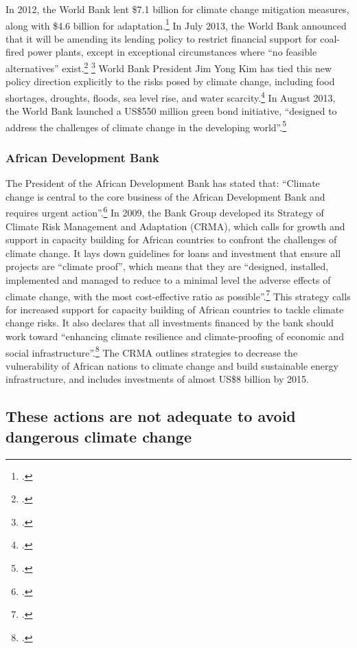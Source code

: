 \documentclass[10pt]{article}
\begin{document}
In 2012, the World Bank lent \$7.1 billion for climate change mitigation measures, along with \$4.6 billion for adaptation.\footcite[][]{WorldBankCCPP}
In July 2013, the World Bank announced that it will be amending its lending policy to restrict financial support for coal-fired power plants, except in exceptional circumstances where ``no feasible alternatives'' exist.\footcite[][]{WorldBankCoal2013} \footcite[See also: ][]{ReutersonWBCoal}
World Bank President Jim Yong Kim has tied this new policy direction explicitly to the risks posed by climate change, including food shortages, droughts, floods, sea level rise, and water scarcity.\footcite[][]{WBPresonCC}
In August 2013, the World Bank launched a US\$550 million green bond initiative, ``designed to address the challenges of climate change in the developing world''.\footcite[][]{WBGreenB2013}



	\subsubsection{African Development Bank}



The President of the African Development Bank has stated that: ``Climate change is central to the core business of the African Development Bank and requires urgent action''.\footcite[][]{AfricanDevBankCCweb}
In 2009, the Bank Group developed its Strategy of Climate Risk Management and Adaptation (CRMA), which calls for growth and support in capacity building for African countries to confront the challenges of climate change. 
It lays down guidelines for loans and investment that ensure all projects are ``climate proof'', which means that they are ``designed, installed, implemented and managed to reduce to a minimal level the adverse effects of climate change, with the most cost-effective ratio as possible''.\footcite[][]{AfricanDevBankCC}
This strategy calls for increased support for capacity building of African countries to tackle climate change risks. 
It also declares that all investments financed by the bank should work toward ``enhancing climate resilience and climate-proofing of economic and social infrastructure''.\footcite[][p.11]{AfricanDevBankCC}
The CRMA outlines strategies to decrease the vulnerability of African nations to climate change and build sustainable energy infrastructure, and includes investments of almost US\$8 billion by 2015.



		\subsection{These actions are not adequate to avoid dangerous climate change}
		
\end{document}
